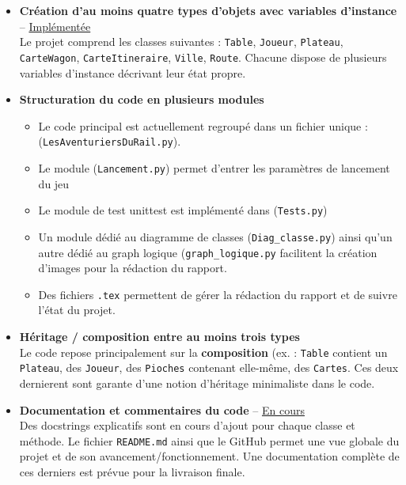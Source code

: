 \documentclass[a4paper,12pt]{report}
\begin{document}
\begin{itemize}
    \item \textbf{Création d’au moins quatre types d’objets avec variables d’instance} – \underline{Implémentée} \\
    Le projet comprend les classes suivantes : \texttt{Table}, \texttt{Joueur}, \texttt{Plateau}, \texttt{CarteWagon},
    \texttt{CarteItineraire}, \texttt{Ville}, \texttt{Route}.
    Chacune dispose de plusieurs variables d’instance décrivant leur état propre.

    \item \textbf{Structuration du code en plusieurs modules}\\
    \begin{itemize}
        \item Le code principal est actuellement regroupé dans un fichier unique : (\texttt{LesAventuriersDuRail.py}).
        \item Le module (\texttt{Lancement.py}) permet d'entrer les paramètres de lancement du jeu
        \item Le module de test unittest est implémenté dans (\texttt{Tests.py})
        \item Un module dédié au diagramme de classes (\texttt{Diag\_classe.py}) ainsi qu'un autre dédié au graph logique
        (\texttt{graph\_logique.py} facilitent la création d'images pour la rédaction du rapport.
        \item Des fichiers \texttt{.tex} permettent de gérer la rédaction du rapport et de suivre l'état du projet.
    \end{itemize}

    \item \textbf{Héritage / composition entre au moins trois types} \\
    Le code repose principalement sur la \textbf{composition}
    (ex. : \texttt{Table} contient un \texttt{Plateau}, des \texttt{Joueur}, des \texttt{Pioches} contenant elle-même,
    des \texttt{Cartes}. Ces deux dernierent sont garante d'une notion d'héritage minimaliste dans le code.

    \item \textbf{Documentation et commentaires du code} – \underline{En cours} \\
    Des docstrings explicatifs sont en cours d’ajout pour chaque classe et méthode.
    Le fichier \texttt{README.md} ainsi que le GitHub permet une vue globale du projet et de son
    avancement/fonctionnement. Une documentation complète de ces derniers est prévue pour la livraison finale.


\end{itemize}
\end{document}
